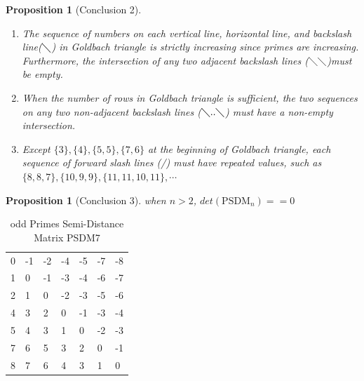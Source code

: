 \documentclass[12pt,a4paper,reqno]{amsart}
\numberwithin{equation}{section}
\theoremstyle{plain}
\newtheorem{proposition}[theorem]{Proposition}
\theoremstyle{definition}
\begin{document}
	\begin{proposition}[Conclusion 2]
		\begin{enumerate}
			\item The sequence of numbers on each vertical line, horizontal line, 
			and backslash line($\diagdown$) in Goldbach triangle is strictly 
			increasing since primes are increasing. Furthermore, the 
			intersection of any two adjacent backslash lines ($\diagdown \diagdown$)must be empty. 
			\item When the number of rows in Goldbach triangle is sufficient, 
			the two sequences on any two non-adjacent backslash lines ($\diagdown..\diagdown$) must have a non-empty intersection. 
			\item Except $\{3\}, \{4\}, \{5, 5\}, \{7, 6\}$ at the beginning of Goldbach triangle, 
			each sequence of forward slash lines (/) must have repeated values, such as \\
			$\{8,8,7\}, \{10,9,9\},\{11,11,10,11\},\cdots$
		\end{enumerate}		
	\end{proposition}

	\begin{proposition}[Conclusion 3]
		when $n>2$, $det(\text{PSDM}_n)==0$
	\end{proposition}
	\begin{table}[h]
		\caption{odd Primes Semi-Distance Matrix PSDM7}
		\label{table:2}
		\begin{tabular}{lllllll}
		0 & -1 & -2 & -4 & -5 & -7 & -8 \\
		1 & 0  & -1 & -3 & -4 & -6 & -7 \\
		2 & 1  & 0  & -2 & -3 & -5 & -6 \\
		4 & 3  & 2  & 0  & -1 & -3 & -4 \\
		5 & 4  & 3  & 1  & 0  & -2 & -3 \\
		7 & 6  & 5  & 3  & 2  & 0  & -1 \\
		8 & 7  & 6  & 4  & 3  & 1  & 0 
		\end{tabular}
	\end{table}








\clearpage


\end{document}
